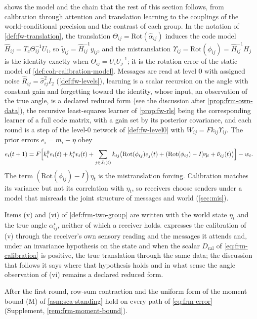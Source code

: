  shows the model and the chain that the rest of this section follows, from calibration through attention and translation learning to the couplings of the world-conditional precision and the contrast of each group. In the notation of \cref{def:fw-translation}, the translation $\Theta_{ij}=\mathrm{Rot}(\hat\alpha_{ij})$ induces the code model $\hat H_{ij}=T_c\Theta_{ij}^{-1}U_i$, so $\tilde y_{ij}=\hat H_{ij}^{-1}y_{ij}$, and the mistranslation $\Upsilon_{ij}=\mathrm{Rot}(\phi_{ij})=\hat H_{ij}^{-1}H_j$ is the identity exactly when $\Theta_{ij}=U_iU_j^{-1}$; it is the rotation error of the static model of \cref{def:coh-calibration-model}. Messages are read at level 0 with assigned noise $\hat R_{ij}=\hat\sigma^2_{ij}I_2$ (\cref{def:fw-levels}), learning is a scalar recursion on the angle with constant gain and forgetting toward the identity, whose input, an observation of the true angle, is a declared reduced form (see the discussion after \cref{prop:frm-own-data}), the recursive least-squares learner of \cref{prop:fw-rls} being the corresponding learner of a full code matrix, with a gain set by its posterior covariance, and each round is a step of the level-0 network of \cref{def:fw-level0} with $W_{ij}=Fk_{ij}\Upsilon_{ij}$. The prior errors $e_i=m_i-\eta$ obey
\begin{equation}\label{eq:frm-error}
e_i(t+1)=F\Bigl[k^0_ie_i(t)+k^s_iv_i(t)+\sum_{j\in J_i(t)}k_{ij}\bigl(\mathrm{Rot}(\phi_{ij})e_j(t)+(\mathrm{Rot}(\phi_{ij})-I)\eta_t+\tilde\nu_{ij}(t)\bigr)\Bigr]-w_t.
\end{equation}
The term $(\mathrm{Rot}(\phi_{ij})-I)\eta_t$ is the mistranslation forcing. Calibration matches its variance but not its correlation with $\eta_t$, so receivers choose senders under a model that misreads the joint structure of messages and world (\cref{sec:mis}).

Items (v) and (vi) of \cref{def:frm-two-group} are written with the world state $\eta_t$ and the true angle $\alpha^\star_{ij}$, neither of which a receiver holds.  expresses the calibration of (v) through the receiver's own sensory reading and the messages it attends and, under an invariance hypothesis on the state and when the scalar $D_{\mathrm{cal}}$ of \eqref{eq:frm-calibration} is positive, the true translation through the same data; the discussion that follows it says where that hypothesis holds and in what sense the angle observation of (vi) remains a declared reduced form.

After the first round, row-sum contraction and the uniform form of the moment bound (M) of \cref{asm:sca-standing} hold on every path of \eqref{eq:frm-error} (Supplement, \cref{rem:frm-moment-bound}).

